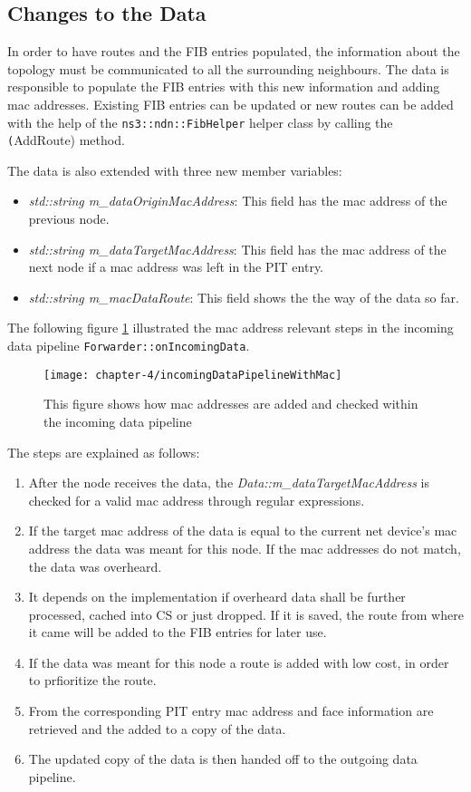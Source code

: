 \subsection{Changes to the Data}

In order to have routes and the FIB entries populated, the information about the topology must be communicated to all the surrounding neighbours. The data is responsible to populate the FIB entries with this new information and adding mac addresses. Existing FIB entries can be updated or new routes can be added with the help of the \texttt{ns3::ndn::FibHelper} helper class by calling the \texttt(AddRoute) method.

The data is also extended with three new member variables:

\begin{itemize}
\item \emph{std::string m\_dataOriginMacAddress}: This field has the mac address of the previous node.
\item \emph{std::string m\_dataTargetMacAddress}: This field has the mac address of the next node if a mac address was left in the PIT entry.
\item \emph{std::string m\_macDataRoute}: This field shows the the way of the data so far.
\end{itemize}

The following figure \ref{fig:incomingDataPipelineWithMac} illustrated the mac address relevant steps in the incoming data pipeline \texttt{Forwarder::onIncomingData}.

\begin{figure}[H]
  \centering
  \texttt{[image: chapter-4/incomingDataPipelineWithMac]}
  \caption{This figure shows how mac addresses are added and checked within the incoming data pipeline}
  \label{fig:incomingDataPipelineWithMac}
\end{figure}

The steps are explained as follows:

\begin{enumerate}
\item After the node receives the data, the \emph{Data::m\_dataTargetMacAddress} is checked for a valid mac address through regular expressions.
\item If the target mac address of the data is equal to the current net device's mac address the data was meant for this node. If the mac addresses do not match, the data was overheard.
\item It depends on the implementation if overheard data shall be further processed, cached into CS or just dropped. If it is saved, the route from where it came will be added to the FIB entries for later use.
\item If the data was meant for this node a route is added with low cost, in order to prfioritize the route.
\item From the corresponding PIT entry mac address and face information are retrieved and the added to a copy of the data.
\item The updated copy of the data is then handed off to the outgoing data pipeline.
\end{enumerate}

